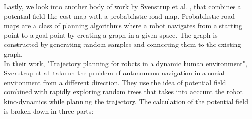 Lastly, we look into another body of work by Svenstrup et al. \cite{svenstrup_trajectory_2010}, that combines a potential field-like cost map with a probabilistic road map. Probabilistic road maps \cite{kavraki_probabilistic_1996} are a class of planning algorithms where a robot navigates from a starting point to a goal point by creating a graph in a given space. The graph is constructed by generating random samples and connecting them to the existing graph.\\
In their work, "Trajectory planning for robots in a dynamic human environment", Svenstrup et al. take on the problem of autonomous navigation in a social environment from a different direction. They use the idea of potential field combined with rapidly exploring random trees that takes into account the robot kino-dynamics while planning the trajectory.
The calculation of the potential field is broken down in three parts:
